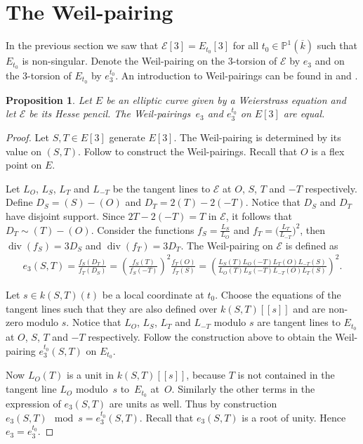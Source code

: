 \documentclass[pdftex]{sigma}
\newcommand{\mpp}{{\mathbb{P}}}
\newcommand{\msetp}[1]{{\left({#1}\right)}}					%
\newcommand{\msets}[1]{{\left[{#1}\right]}}					%
\newcommand{\msetss}[1]{{\left[\left[{#1}\right]\right]}}	%
\newcommand{\mac}[1]{{\overline{#1}}}
\newcommand{\mdiv}[1]{\operatorname{div}\msetp{#1}}			%
\newcommand{\mps}[2]{{\mpp^{#1}\msetp{#2}}}						%
\numberwithin{equation}{section}
\newtheorem{Proposition}[Theorem]{Proposition}
\begin{document}
\section{The Weil-pairing}\label{hpga:sec:wp}

In the previous section we saw that $\mathcal{E}\msets{3}=E_{t_0}\msets{3}$ for all $t_0\in\mps{1}{\mac{k}}$ such that $E_{t_0}$ is non-singular. Denote the Weil-pairing on the 3-torsion of $\mathcal{E}$ by $e_3$ and on the 3-torsion of $E_{t_0}$ by $e_3^{t_0}$. An introduction to Weil-pairings can be found in \cite[Section~III.8]{silverman1985} and \cite[Sections~3.3 and~11.2]{washington2008}.

\begin{Proposition}Let $E$ be an elliptic curve given by a Weierstrass equation and let $\mathcal {E}$ be its Hesse pencil. The Weil-pairings~$e_3$ and $e_3^{t_0}$ on $E\msets {3}$ are equal.
\end{Proposition}
\begin{proof}Let $S,T\in E\msets{3}$ generate $E\msets{3}$. The Weil-pairing is determined by its value on $\msetp{S,T}$. Follow \cite[Exercise~3.16]{silverman1985} to construct the Weil-pairings. Recall that $O$ is a flex point on $E$.

Let $L_O$, $L_S$, $L_T$ and $L_{-T}$ be the tangent lines to $\mathcal{E}$ at $O$, $S$, $T$ and $-T$ respectively. Define $D_S=\msetp{S}-\msetp{O}$ and $D_T= 2\msetp{T}-2\msetp{-T}$. Notice that $D_S$ and $D_T$ have disjoint support. Since $2T-2\msetp{-T}=T$ in $\mathcal{E}$, it follows that $D_T\sim\msetp{T}- \msetp{O}$. Consider the functions $f_S=\frac{L_S}{L_O}$ and $f_T=\big(\frac{L_T}{L_{-T}}\big)^2$, then $\mdiv{f_S}=3D_S$ and $\mdiv{f_T}=3D_T$. The Weil-pairing on $\mathcal{E}$ is defined as
\begin{gather*}
e_3\msetp{S,T}=\frac{f_S\msetp{D_T}}{f_T\msetp{D_S}} =\msetp{\frac{f_S\msetp{T}}{f_S\msetp{-T}}}^2\frac{f_T\msetp{O}}{f_T\msetp{S}}
=\msetp{\frac{L_S\msetp{T}L_O\msetp{-T}L_T\msetp{O}L_{-T}\msetp{S}}{L_O\msetp{T}L_S\msetp{-T}L_{-T}\msetp{O}L_T\msetp{S}}}^2.
\end{gather*}

Let $s\in k\msetp{S,T}\msetp{t}$ be a local coordinate at $t_0$. Choose the equations of the tangent lines such that they are also defined over $k\msetp{S,T}\msetss{s}$ and are non-zero modulo $s$. Notice that $L_O$, $L_S$, $L_T$ and $L_{-T}$ modulo $s$ are tangent lines to $E_{t_0}$ at $O$, $S$, $T$ and $-T$ respectively. Follow the construction above to obtain the Weil-pairing $e_3^{t_0}\msetp{S,T}$ on $E_{t_0}$.

Now $L_O\msetp{T}$ is a unit in $k\msetp{S,T}\msetss{s}$, because $T$ is not contained in the tangent line $L_O$ modulo~$s$ to~$E_{t_0}$ at~$O$. Similarly the other terms in the expression of $e_3\msetp{S,T}$ are units as well. Thus by construction $e_3\msetp{S,T}\!\!\mod s= e_3^{t_0}\msetp{S,T}$. Recall that $e_3\msetp{S,T}$ is a root of unity. Hence $e_3=e_3^{t_0}$.
\end{proof}
\end{document}
